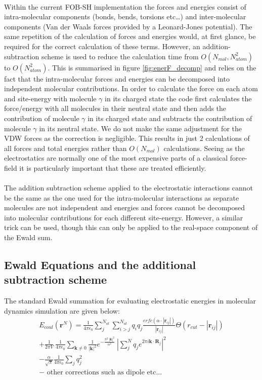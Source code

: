 \\
Within the current FOB-SH implementation the forces and energies consist of intra-molecular components (bonds, bends, torsions etc\ldots) and inter-molecular components (Van der Waals forces provided by a Leonard-Jones potential). The same repetition of the calculation of forces and energies would, at first glance, be required for the correct calculation of these terms. However, an addition-subtraction scheme is used to reduce the calculation time from $O(N_{mol}, N_{atom}^2)$ to $O(N_{atom}^2)$. This is summarised in figure \ref{fig:enerF_decomp} and relies on the fact that the intra-molecular forces and energies can be decomposed into independent molecular contributions. In order to calculate the force on each atom and site-energy with molecule $\gamma$ in its charged state the code first calculates the force/energy with all molecules in their neutral state and then adds the contribution of molecule $\gamma$ in its charged state and subtracts the contribution of molecule $\gamma$ in its neutral state. We do not make the same adjustment for the VDW forces as the correction is negligible. This results in just 2 calculations of all forces and total energies rather than $O(N_{mol})$ calculations. Seeing as the electrostatics are normally one of the most expensive parts of a classical force-field it is particularly important that these are treated efficiently.
\\\\
The addition subtraction scheme applied to the electrostatic interactions cannot be the same as the one used for the intra-molecular interactions as separate molecules are not independent and energies and forces cannot be decomposed into molecular contributions for each different site-energy. However, a similar trick can be used, though this can only be applied to the real-space component of the Ewald sum.
\subsection{Ewald Equations and the additional subtraction scheme}
The standard Ewald summation for evaluating electrostatic energies in molecular dynamics simulation are given below:
\begin{eqnarray}
E_{coul}\left(\mathbf{r}^{N}\right)
=
 \frac{1}{4 \pi \epsilon_0} \sum_{j}^{N_{at}} \sum_{i > j}^{N_{at}} q_i q_j \frac{erfc\left( \alpha \cdot |\mathbf{r}_{ij}|\right)}{|\mathbf{r}_{ij}|} \Theta\left( r_{cut} - |\mathbf{r}_{ij}| \right)
\\
+
\frac{1}{2\pi V} \ \frac{1}{4 \pi \epsilon_0} \sum_{\mathbf{k} \neq 0} \frac{1}{|\mathbf{k}|^2} e^{-\frac{\pi^2 \ |\mathbf{k}|^2}{\alpha^2}} \ \left|\sum_{j}^{N} q_{j} e^{2\pi i \mathbf{k} \cdot \mathbf{R}_{j}}\right|^2 \\
- \frac{\alpha}{\sqrt{\pi}} \frac{1}{4 \pi \epsilon_{0}} \sum_{j} q_{j}^2
\\
- \text{ \ other corrections such as dipole etc...}
\label{eq:EwaldStd}
\end{eqnarray}




